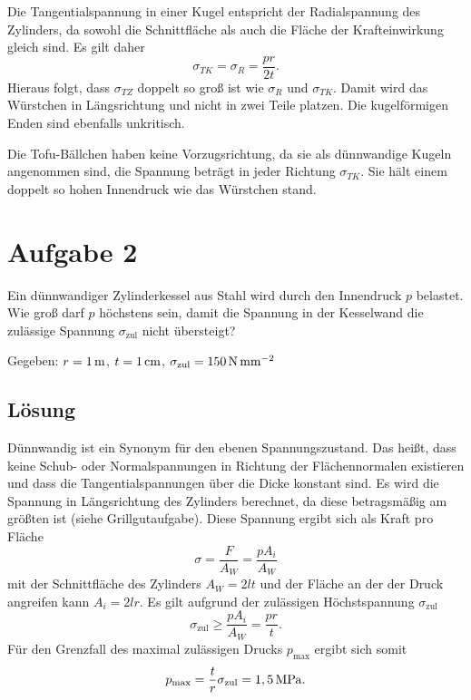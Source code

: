 \documentclass{exercise}
\begin{document}
    Die Tangentialspannung in einer Kugel entspricht der Radialspannung des Zylinders, da sowohl die Schnittfläche als auch die Fläche der Krafteinwirkung gleich sind.
    Es gilt daher
    \[
        \sigma_{TK} = \sigma_R = \frac{pr}{2t}.
    \]
    Hieraus folgt, dass \(\sigma_{TZ}\) doppelt so groß ist wie \(\sigma_R\) und \(\sigma_{TK}\).
    Damit wird das Würstchen in Längsrichtung und nicht in zwei Teile platzen.
    Die kugelförmigen Enden sind ebenfalls unkritisch.

    Die Tofu-Bällchen haben keine Vorzugsrichtung, da sie als dünnwandige Kugeln angenommen sind, die Spannung beträgt in jeder Richtung \(\sigma_{TK}\).
    Sie hält einem doppelt so hohen Innendruck wie das Würstchen stand.


    \section*{Aufgabe 2}

    \begin{problem}
        Ein dünnwandiger Zylinderkessel aus Stahl wird durch den Innendruck \(p\) belastet.
        Wie groß darf \(p\) höchstens sein, damit die Spannung in der Kesselwand die zulässige Spannung \(\sigma_{\text{zul}}\) nicht übersteigt?

        Gegeben: \(r = 1\,\si{\meter}\), \(t = 1\,\si{\centi\meter}\), \(\sigma_{\text{zul}} = 150\,\si{\newton\per\milli\meter\squared}\)
    \end{problem}

    \subsection*{Lösung}
    Dünnwandig ist ein Synonym für den ebenen Spannungszustand.
    Das heißt, dass keine Schub- oder Normalspannungen in Richtung der Flächennormalen existieren und dass die Tangentialspannungen über die Dicke konstant sind.
    Es wird die Spannung in Längsrichtung des Zylinders berechnet, da diese betragsmäßig am größten ist (siehe Grillgutaufgabe).
    Diese Spannung ergibt sich als Kraft pro Fläche
    \[
        \sigma = \frac{F}{A_W} = \frac{pA_i}{A_W}
    \]
    mit der Schnittfläche des Zylinders \(A_W = 2lt\) und der Fläche an der der Druck angreifen kann \(A_i = 2lr\).
    Es gilt aufgrund der zulässigen Höchstspannung \(\sigma_{\text{zul}}\)
    \[
        \sigma_{\text{zul}} \ge \frac{pA_i}{A_W} = \frac{pr}{t}.
    \]
    Für den Grenzfall des maximal zulässigen Drucks \(p_{\text{max}}\) ergibt sich somit
    \[
        p_{\text{max}} = \frac{t}{r}\sigma_{\text{zul}} = 1,5\,\si{\mega\pascal}.
    \]
\end{document}
